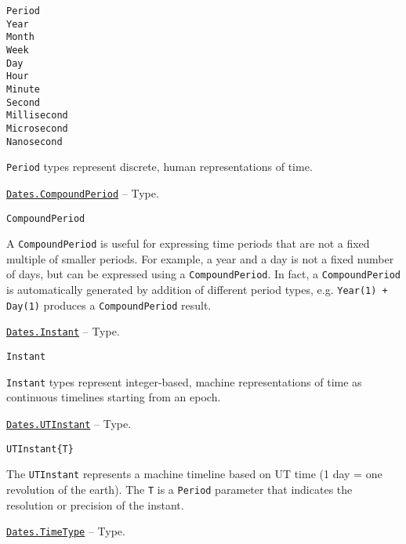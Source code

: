 \begin{adjustwidth}{2em}{0pt}


\begin{verbatim}
Period
Year
Month
Week
Day
Hour
Minute
Second
Millisecond
Microsecond
Nanosecond
\end{verbatim}

\texttt{Period} types represent discrete, human representations of time.



\end{adjustwidth}
\hypertarget{10034674628199158268}{} 
\hyperlink{10034674628199158268}{\texttt{Dates.CompoundPeriod}}  -- {Type.}

\begin{adjustwidth}{2em}{0pt}


\begin{verbatim}
CompoundPeriod
\end{verbatim}

A \texttt{CompoundPeriod} is useful for expressing time periods that are not a fixed multiple of smaller periods. For example, {\textquotedbl}a year and a  day{\textquotedbl} is not a fixed number of days, but can be expressed using a \texttt{CompoundPeriod}. In fact, a \texttt{CompoundPeriod} is automatically generated by addition of different period types, e.g. \texttt{Year(1) + Day(1)} produces a \texttt{CompoundPeriod} result.



\end{adjustwidth}
\hypertarget{4529923194910083363}{} 
\hyperlink{4529923194910083363}{\texttt{Dates.Instant}}  -- {Type.}

\begin{adjustwidth}{2em}{0pt}


\begin{verbatim}
Instant
\end{verbatim}

\texttt{Instant} types represent integer-based, machine representations of time as continuous timelines starting from an epoch.



\end{adjustwidth}
\hypertarget{5087474460137130402}{} 
\hyperlink{5087474460137130402}{\texttt{Dates.UTInstant}}  -- {Type.}

\begin{adjustwidth}{2em}{0pt}


\begin{verbatim}
UTInstant{T}
\end{verbatim}

The \texttt{UTInstant} represents a machine timeline based on UT time (1 day = one revolution of the earth). The \texttt{T} is a \texttt{Period} parameter that indicates the resolution or precision of the instant.



\end{adjustwidth}
\hypertarget{4438614350756187528}{} 
\hyperlink{4438614350756187528}{\texttt{Dates.TimeType}}  -- {Type.}

